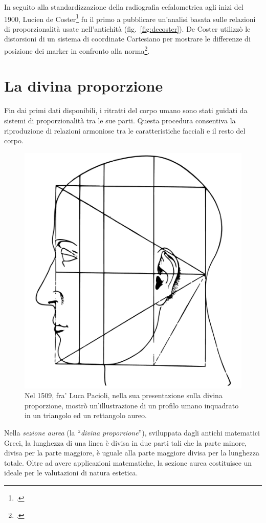 In seguito alla standardizzazione della radiografia cefalometrica agli inizi del 1900, Lucien de Coster\footcite{Coster1939} fu il primo a pubblicare un'analisi basata sulle relazioni di proporzionalità usate nell'antichità (fig.~\vref{fig:decoster}). De Coster utilizzò le distorsioni di un sistema di coordinate Cartesiano per mostrare le differenze di posizione dei marker in confronto alla norma\footcite{Izard1943}.

\section{La divina proporzione}

Fin dai primi dati disponibili, i ritratti del corpo umano sono stati guidati da sistemi di proporzionalità tra le sue parti. Questa procedura consentiva la riproduzione di relazioni armoniose tra le caratteristiche facciali e il resto del corpo.

\begin{figure}
\centering
\includegraphics[width=.5\textwidth]{./images/pacioli.pdf}
\caption{Nel 1509, fra' Luca Pacioli, nella sua presentazione sulla divina proporzione, mostrò un'illustrazione di un profilo umano inquadrato in un triangolo ed un rettangolo aureo.}
\label{fig:pacioli}
\end{figure}

Nella \textit{sezione aurea} (la ``\textit{divina proporzione}''), sviluppata dagli antichi matematici Greci, la lunghezza di una linea è divisa in due parti tali che la parte minore, divisa per la parte maggiore, è uguale alla parte maggiore divisa per la lunghezza totale. Oltre ad avere applicazioni matematiche, la sezione aurea costituisce un ideale per le valutazioni di natura estetica.

